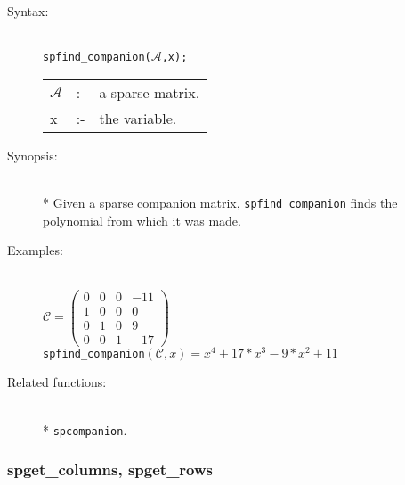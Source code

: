 \begin{description}
\item[Syntax:]\mbox{}\\
 \texttt{spfind\_companion($\mathcal{A}$,x);}\\[2mm]
\begin{tabular}{l l l}
$\mathcal{A}$ &:-& a sparse matrix. \\
x          &:-& the variable.
\end{tabular}

\item[Synopsis:]\mbox{}\\*
  Given a sparse companion matrix, \texttt{spfind\_companion} finds the polynomial
from which it was made.

\item[Examples:]\mbox{}\\
\(\mathcal{C} = \begin{pmatrix} 0 & 0 & 0 & -11 \\ 1 & 0 & 0 & 0
\\ 0 & 1 & 0 & 9 \\ 0 & 0 & 1 & -17
\end{pmatrix}\) \\[2mm]
\texttt{spfind\_companion}\((\mathcal{C},x) = x^4+17*x^3-9*x^2+11\)

\item[Related functions:]\mbox{}\\*
 \texttt{spcompanion}.
\end{description}

\subsubsection{spget\_columns, spget\_rows}
\label{sparse:spget_columns}

